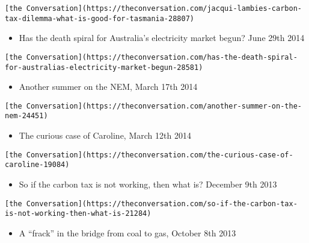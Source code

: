 \documentclass[
]{article}
\providecommand{\tightlist}{%
  \setlength{\itemsep}{0pt}\setlength{\parskip}{0pt}}
\begin{document}
\begin{verbatim}
[the Conversation](https://theconversation.com/jacqui-lambies-carbon-tax-dilemma-what-is-good-for-tasmania-28807)
\end{verbatim}

\begin{itemize}
\tightlist
\item
  Has the death spiral for Australia's electricity market begun? June
  29th 2014
\end{itemize}

\begin{verbatim}
[the Conversation](https://theconversation.com/has-the-death-spiral-for-australias-electricity-market-begun-28581)
\end{verbatim}

\begin{itemize}
\tightlist
\item
  Another summer on the NEM, March 17th 2014
\end{itemize}

\begin{verbatim}
[the Conversation](https://theconversation.com/another-summer-on-the-nem-24451)
\end{verbatim}

\begin{itemize}
\tightlist
\item
  The curious case of Caroline, March 12th 2014
\end{itemize}

\begin{verbatim}
[the Conversation](https://theconversation.com/the-curious-case-of-caroline-19084)
\end{verbatim}

\begin{itemize}
\tightlist
\item
  So if the carbon tax is not working, then what is? December 9th 2013
\end{itemize}

\begin{verbatim}
[the Conversation](https://theconversation.com/so-if-the-carbon-tax-is-not-working-then-what-is-21284)
\end{verbatim}

\begin{itemize}
\tightlist
\item
  A ``frack'' in the bridge from coal to gas, October 8th 2013
\end{itemize}
\end{document}
